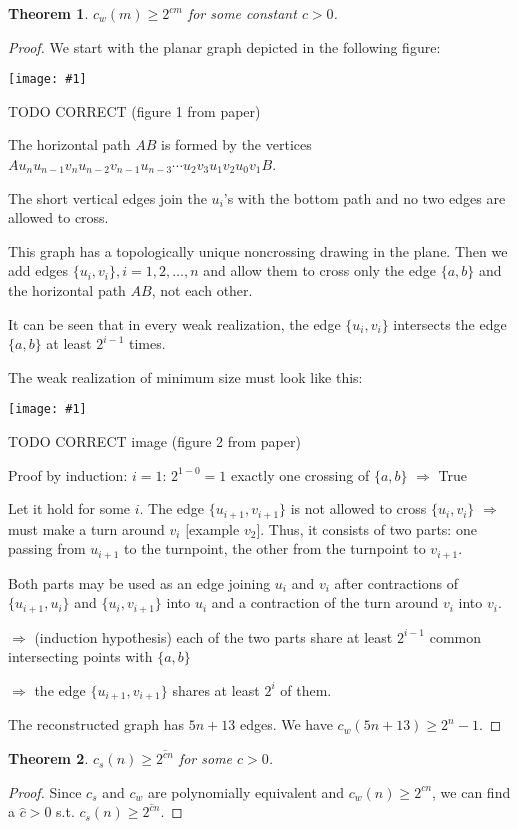 \documentclass[12pt]{article}
\theoremstyle{plain} %
\newtheorem{theorem}{Theorem}
\newcommand{\set}[1]{\{#1\}}
\newcommand{\image}[1]{\begin{center}\texttt{[image: \#1]}\end{center}}
\begin{document}
\begin{theorem}
    \(c_w(m) \geq 2^{c m}\) for some constant \(c > 0\).
\end{theorem}

\begin{proof}
We start with the planar graph depicted in the following figure:

\image{images/figure-11.jpeg}
TODO CORRECT (figure 1 from paper)

The horizontal path \(AB\) is formed by 
the vertices \(A u_n u_{n-1} v_n u_{n-2} v_{n-1} u_{n-3} \cdots u_2 v_3 u_1 v_2 u_0 v_1 B \).

The short vertical edges join the \(u_i\)'s with the bottom path
and no two edges are allowed to cross.

This graph has a topologically unique noncrossing drawing in the plane.
Then we add edges \(\set{u_i, v_i}, i=1,2,\ldots, n \) and allow them to cross
only the edge \(\set{a,b}\) and the horizontal path \(AB\), not each other.

It can be seen that in every weak realization, the edge \(\set{u_i, v_i}\) intersects 
the edge \(\set{a,b}\) at least \(2^{i-1}\) times.

The weak realization of minimum size must look like this:

\image{images/figure-12.jpeg}
TODO CORRECT image (figure 2 from paper)

Proof by induction:
\(i=1\): \(2^{1-0} = 1\) exactly one crossing of 
\(\set{a,b}\) \(\Rightarrow\) True

Let it hold for some \(i\). The edge \(\set{u_{i+1}, v_{i+1}}\)
is not allowed to cross \(\set{u_i, v_i}\) \(\Rightarrow\) must make 
a turn around \(v_i\) [example \(v_2\)].
Thus, it consists of two parts: one passing from \(u_{i+1}\) to 
the turnpoint, the other from the turnpoint to \(v_{i+1}\).

Both parts may be used as an edge joining \(u_i\) and \(v_i\) 
after contractions of \(\set{u_{i+1}, u_i}\) and \(\set{u_i, v_{i+1}}\) 
into \(u_i\) and a contraction of the turn around \(v_i\) into \(v_i\).

\(\Rightarrow\) (induction hypothesis) each of the two parts share at least 
\(2^{i-1}\) common intersecting points with \(\set{a,b}\)

\(\Rightarrow\) the edge \(\set{u_{i+1}, v_{i+1}}\) shares at least \(2^i\) of them.

The reconstructed graph has \(5n + 13\) edges. We have \(c_w(5n + 13) \geq 2^n - 1\).
\end{proof}

\begin{theorem}
    \(c_s(n) \geq 2^{\hat{c} n}\) for some \(c > 0\).
\end{theorem}

\begin{proof}
Since \(c_s\) and \(c_w\) are polynomially equivalent 
and \(c_w(n) \geq 2^{c n}\), we can find a 
\(\hat{c} > 0\) s.t. \(c_s(n) \geq 2^{\hat{c} n}\).
\end{proof}
\end{document}
